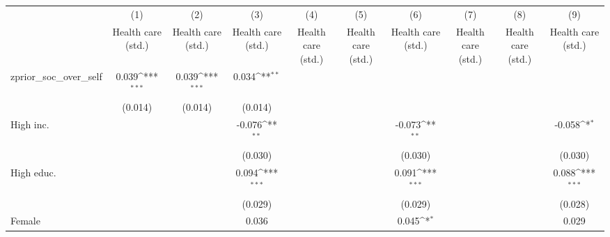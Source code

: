 {
\def\sym#1{\ifmmode^{#1}\else\(^{#1}\)\fi}
\begin{tabular}{l*{9}{c}}
\toprule
                    &\multicolumn{1}{c}{(1)}&\multicolumn{1}{c}{(2)}&\multicolumn{1}{c}{(3)}&\multicolumn{1}{c}{(4)}&\multicolumn{1}{c}{(5)}&\multicolumn{1}{c}{(6)}&\multicolumn{1}{c}{(7)}&\multicolumn{1}{c}{(8)}&\multicolumn{1}{c}{(9)}\\
                    &\multicolumn{1}{c}{Health care (std.)}&\multicolumn{1}{c}{Health care (std.)}&\multicolumn{1}{c}{Health care (std.)}&\multicolumn{1}{c}{Health care (std.)}&\multicolumn{1}{c}{Health care (std.)}&\multicolumn{1}{c}{Health care (std.)}&\multicolumn{1}{c}{Health care (std.)}&\multicolumn{1}{c}{Health care (std.)}&\multicolumn{1}{c}{Health care (std.)}\\
\midrule
zprior\_soc\_over\_self&       0.039\sym{***}&       0.039\sym{***}&       0.034\sym{**} &                     &                     &                     &                     &                     &                     \\
                    &     (0.014)         &     (0.014)         &     (0.014)         &                     &                     &                     &                     &                     &                     \\
\addlinespace
High inc.           &                     &                     &      -0.076\sym{**} &                     &                     &      -0.073\sym{**} &                     &                     &      -0.058\sym{*}  \\
                    &                     &                     &     (0.030)         &                     &                     &     (0.030)         &                     &                     &     (0.030)         \\
\addlinespace
High educ.          &                     &                     &       0.094\sym{***}&                     &                     &       0.091\sym{***}&                     &                     &       0.088\sym{***}\\
                    &                     &                     &     (0.029)         &                     &                     &     (0.029)         &                     &                     &     (0.028)         \\
\addlinespace
Female              &                     &                     &       0.036         &                     &                     &       0.045\sym{*}  &                     &                     &       0.029         \\

\end{tabular}}
